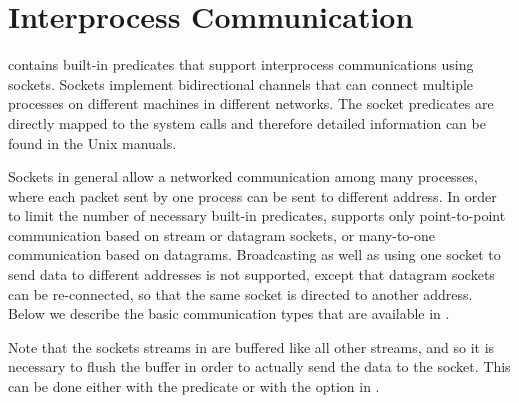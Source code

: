 %
%
%
%
%
%
%

\chapter{Interprocess Communication}
\label{sockets}
{\eclipse} contains built-in predicates that support interprocess communications
using sockets.
Sockets implement bidirectional channels
that can connect multiple processes on different machines
in different networks.
The socket predicates are directly mapped to the system calls
and therefore detailed information can be found in the Unix manuals.

Sockets in general allow a networked communication among many processes,
where each packet sent by one process can be sent to different address.
In order to limit the number of necessary built-in predicates,
{\eclipse} supports only point-to-point communication based
on stream or datagram sockets, or many-to-one communication
based on datagrams.
Broadcasting as well as using one socket to send data
to different addresses is not supported, except that
datagram sockets can be re-connected, so that the same
socket is directed to another address.
Below we describe the basic communication types that are available
in {\eclipse}.

Note that the sockets streams in {\eclipse} are buffered like
all other streams, and so it is necessary to flush
the buffer in order to actually send the data to the socket.
This can be done either with the
 predicate
or with the option  in
.%

